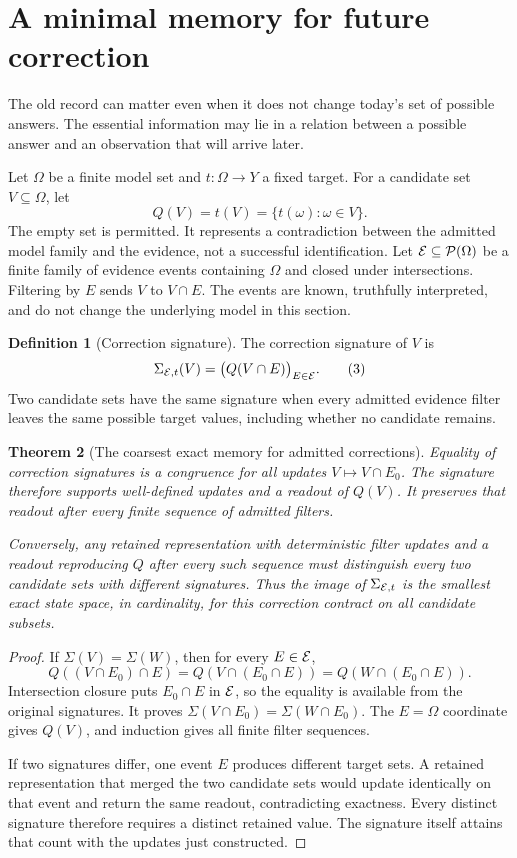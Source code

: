 \documentclass[11pt,letterpaper]{article}
\theoremstyle{plain}
\newtheorem{theorem}{Theorem}[section]
\theoremstyle{definition}
\newtheorem{definition}[theorem]{Definition}
\begin{document}
\section{A minimal memory for future correction}\label{sec:memory}
The old record can matter even when it does not change today's set of possible answers. The essential information may lie in a relation between a possible answer and an observation that will arrive later.

Let $\Omega$ be a finite model set and $t:\Omega\to Y$ a fixed target. For a candidate set $V\subseteq\Omega$, let
\[
Q(V)=t(V)=\{t(\omega):\omega\in V\}.
\]
The empty set is permitted. It represents a contradiction between the admitted model family and the evidence, not a successful identification. Let $\mathcal E\subseteq\mathcal P(\Omega)$ be a finite family of evidence events containing $\Omega$ and closed under intersections. Filtering by $E$ sends $V$ to $V\cap E$. The events are known, truthfully interpreted, and do not change the underlying model in this section.

\begin{definition}[Correction signature]\label{def:signature}
The correction signature of $V$ is
\[
\Sigma_{\mathcal E,t}(V)=\bigl(Q(V\cap E)\bigr)_{E\in\mathcal E}.\tag{3}
\]
Two candidate sets have the same signature when every admitted evidence filter leaves the same possible target values, including whether no candidate remains.
\end{definition}

\begin{theorem}[The coarsest exact memory for admitted corrections]\label{thm:correction}
Equality of correction signatures is a congruence for all updates $V\mapsto V\cap E_0$. The signature therefore supports well-defined updates and a readout of $Q(V)$. It preserves that readout after every finite sequence of admitted filters.

Conversely, any retained representation with deterministic filter updates and a readout reproducing $Q$ after every such sequence must distinguish every two candidate sets with different signatures. Thus the image of $\Sigma_{\mathcal E,t}$ is the smallest exact state space, in cardinality, for this correction contract on all candidate subsets.
\end{theorem}
\begin{proof}
If $\Sigma(V)=\Sigma(W)$, then for every $E\in\mathcal E$,
\[
Q((V\cap E_0)\cap E)=Q(V\cap(E_0\cap E))
=Q(W\cap(E_0\cap E)).
\]
Intersection closure puts $E_0\cap E$ in $\mathcal E$, so the equality is available from the original signatures. It proves $\Sigma(V\cap E_0)=\Sigma(W\cap E_0)$. The $E=\Omega$ coordinate gives $Q(V)$, and induction gives all finite filter sequences.

If two signatures differ, one event $E$ produces different target sets. A retained representation that merged the two candidate sets would update identically on that event and return the same readout, contradicting exactness. Every distinct signature therefore requires a distinct retained value. The signature itself attains that count with the updates just constructed.
\end{proof}
\end{document}
